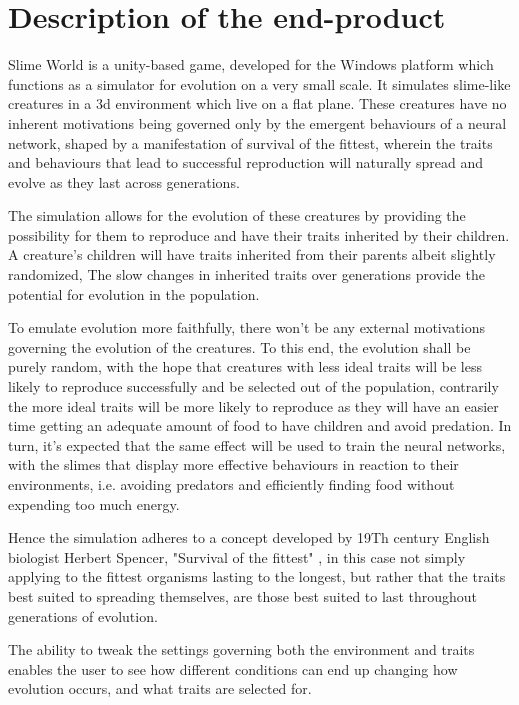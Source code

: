 \section{Description of the end-product}
\par
Slime World is a unity-based game, developed for the Windows platform which functions as a simulator for evolution on a very small scale. It simulates slime-like creatures in a 3d environment which live on a flat plane. These creatures have no inherent motivations being governed only by the emergent behaviours of a neural network, shaped by a manifestation of survival of the fittest, wherein the traits and behaviours that lead to successful reproduction will naturally spread and evolve as they last across generations.
\par
The simulation allows for the evolution of these creatures by providing the possibility for them to reproduce and have their traits inherited by their children. A creature's children will have traits inherited from their parents albeit slightly randomized,  The slow changes in inherited traits over generations provide the potential for evolution in the population.
\par
To emulate evolution more faithfully, there won't be any external motivations governing the evolution of the creatures. To this end, the evolution shall be purely random, with the hope that creatures with less ideal traits will be less likely to reproduce successfully and be selected out of the population, contrarily the more ideal traits will be more likely to reproduce as they will have an easier time getting an adequate amount of food to have children and avoid predation. In turn, it's expected that the same effect will be used to train the neural networks, with the slimes that display more effective behaviours in reaction to their environments, i.e. avoiding predators and efficiently finding food without expending too much energy.
\par
Hence the simulation adheres to a concept developed by 19Th century English biologist Herbert Spencer, "Survival of the fittest" \cite{spencer1866principles}, in this case not simply applying to the fittest organisms lasting to the longest, but rather that the traits best suited to spreading themselves, are those best suited to last throughout generations of evolution.
\par
The ability to tweak the settings governing both the environment and traits enables the user to see how different conditions can end up changing how evolution occurs, and what traits are selected for.
